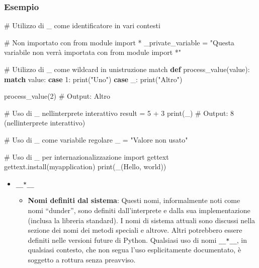 \documentclass[
  letterpaper,
  DIV=11,
  numbers=noendperiod]{scrreprt}
\newenvironment{Shaded}{\begin{snugshade}}{\end{snugshade}}
\newcommand{\BuiltInTok}[1]{\textcolor[rgb]{0.00,0.23,0.31}{#1}}
\newcommand{\CommentTok}[1]{\textcolor[rgb]{0.37,0.37,0.37}{#1}}
\newcommand{\ControlFlowTok}[1]{\textcolor[rgb]{0.00,0.23,0.31}{\textbf{#1}}}
\newcommand{\DecValTok}[1]{\textcolor[rgb]{0.68,0.00,0.00}{#1}}
\newcommand{\ImportTok}[1]{\textcolor[rgb]{0.00,0.46,0.62}{#1}}
\newcommand{\KeywordTok}[1]{\textcolor[rgb]{0.00,0.23,0.31}{\textbf{#1}}}
\newcommand{\NormalTok}[1]{\textcolor[rgb]{0.00,0.23,0.31}{#1}}
\newcommand{\OperatorTok}[1]{\textcolor[rgb]{0.37,0.37,0.37}{#1}}
\newcommand{\StringTok}[1]{\textcolor[rgb]{0.13,0.47,0.30}{#1}}
\providecommand{\tightlist}{%
  \setlength{\itemsep}{0pt}\setlength{\parskip}{0pt}}\usepackage{longtable,booktabs,array}
\begin{document}
\subsubsection{Esempio}\label{esempio-1}

\begin{Shaded}
\begin{Highlighting}[]
\CommentTok{\# Utilizzo di \_ come identificatore in vari contesti}

\CommentTok{\# Non importato con from module import *}
\NormalTok{\_private\_variable }\OperatorTok{=} \StringTok{"Questa variabile non verrà importata con \textquotesingle{}from module import *\textquotesingle{}"}

\CommentTok{\# Utilizzo di \_ come wildcard in un\textquotesingle{}istruzione match}
\KeywordTok{def}\NormalTok{ process\_value(value):}
    \ControlFlowTok{match}\NormalTok{ value:}
        \ControlFlowTok{case} \DecValTok{1}\NormalTok{:}
            \BuiltInTok{print}\NormalTok{(}\StringTok{"Uno"}\NormalTok{)}
        \ControlFlowTok{case}\NormalTok{ \_:}
            \BuiltInTok{print}\NormalTok{(}\StringTok{"Altro"}\NormalTok{)}

\NormalTok{process\_value(}\DecValTok{2}\NormalTok{)  }\CommentTok{\# Output: Altro}

\CommentTok{\# Uso di \_ nell\textquotesingle{}interprete interattivo}
\NormalTok{result }\OperatorTok{=} \DecValTok{5} \OperatorTok{+} \DecValTok{3}
\BuiltInTok{print}\NormalTok{(\_)  }\CommentTok{\# Output: 8 (nell\textquotesingle{}interprete interattivo)}

\CommentTok{\# Uso di \_ come variabile regolare}
\NormalTok{\_ }\OperatorTok{=} \StringTok{"Valore non usato"}

\CommentTok{\# Uso di \_ per internazionalizzazione}
\ImportTok{import}\NormalTok{ gettext}
\NormalTok{gettext.install(}\StringTok{\textquotesingle{}myapplication\textquotesingle{}}\NormalTok{)}
\BuiltInTok{print}\NormalTok{(\_(}\StringTok{\textquotesingle{}Hello, world\textquotesingle{}}\NormalTok{))}
\end{Highlighting}
\end{Shaded}

\begin{itemize}
\tightlist
\item
  \texttt{\_\_*\_\_}

  \begin{itemize}
  \tightlist
  \item
    \textbf{Nomi definiti dal sistema}: Questi nomi, informalmente noti
    come nomi ``dunder'', sono definiti dall'interprete e dalla sua
    implementazione (inclusa la libreria standard). I nomi di sistema
    attuali sono discussi nella sezione dei nomi dei metodi speciali e
    altrove. Altri potrebbero essere definiti nelle versioni future di
    Python. Qualsiasi uso di nomi \texttt{\_\_*\_\_}, in qualsiasi
    contesto, che non segua l'uso esplicitamente documentato, è soggetto
    a rottura senza preavviso.
  \end{itemize}
\end{itemize}
\end{document}
